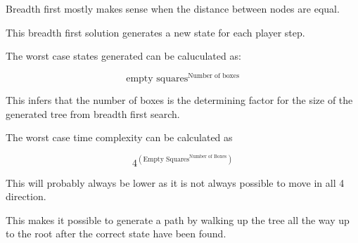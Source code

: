 \documentclass[../../main.tex]{subfiles}
\begin{document}
Breadth first mostly makes sense when the distance between nodes are equal.

This breadth first solution generates a new state for each player step.

The worst case states generated can be caluculated as:

\begin{equation}
	\textrm{empty squares}^{ \textrm{Number of boxes}}
\end{equation}

This infers that the number of boxes is the determining factor for the size
of the generated tree from breadth first search.

The worst case time complexity can be calculated as

\begin{equation}
	4^{  \left(  \textrm{Empty Squares} ^{ \textrm{Number of Boxes}}  \right)   }
\end{equation}

This will probably always be lower as it is not always possible to move in all 4 direction.


This makes it possible to generate a path by walking up the tree all the way up to the root after the correct state have 		been found.
	
\end{document}
